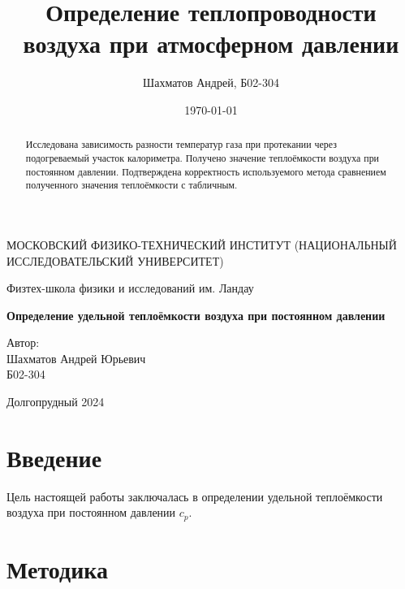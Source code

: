 \documentclass[12pt]{article}
\title{Определение теплопроводности воздуха при атмосферном давлении}
\author{Шахматов Андрей, Б02-304}
\date{\today}
\begin{document}
\begin{titlepage}
    \begin{center}
        {\large МОСКОВСКИЙ ФИЗИКО-ТЕХНИЧЕСКИЙ ИНСТИТУТ (НАЦИОНАЛЬНЫЙ ИССЛЕДОВАТЕЛЬСКИЙ УНИВЕРСИТЕТ)}
    \end{center}
    \begin{center}
        {\large Физтех-школа физики и исследований им. Ландау}
    \end{center}
    
    
    \vspace{3cm}
    {\huge
        \begin{center}
            \textbf{Определение удельной теплоёмкости воздуха при постоянном давлении}
        \end{center}
    }
    \vspace{2cm}
    \begin{flushright}
        {\LARGE Автор:\\ Шахматов Андрей Юрьевич \\
            \vspace{0.2cm}
            Б02-304}
    \end{flushright}
    \vspace{7 cm}
    \begin{center}
        Долгопрудный 2024
    \end{center}
\end{titlepage}


\begin{abstract}
    Исследована зависимость разности температур газа при протекании через подогреваемый участок калориметра.
    Получено значение теплоёмкости воздуха при постоянном давлении. Подтверждена корректность используемого метода 
    сравнением полученного значения теплоёмкости с табличным.
\end{abstract}

\tableofcontents

\section{Введение}
Цель настоящей работы заключалась в определении удельной теплоёмкости воздуха при постоянном давлении $c_p$.

\section{Методика}
\end{document}
